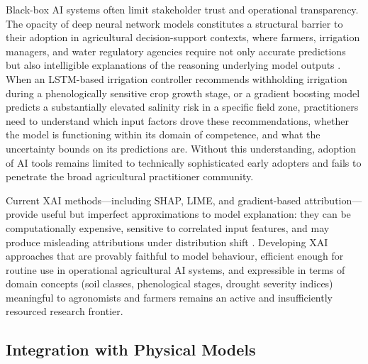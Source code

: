 \documentclass[land,article,submit,pdftex,moreauthors]{Definitions/mdpi}
\numberwithin{equation}{section}
\begin{document}
Black-box AI systems often limit stakeholder trust and operational transparency. The opacity of deep neural network models constitutes a structural barrier to their adoption in agricultural decision-support contexts, where farmers, irrigation managers, and water regulatory agencies require not only accurate predictions but also intelligible explanations of the reasoning underlying model outputs \citep{arrieta2020explainable}. When an LSTM-based irrigation controller recommends withholding irrigation during a phenologically sensitive crop growth stage, or a gradient boosting model predicts a substantially elevated salinity risk in a specific field zone, practitioners need to understand which input factors drove these recommendations, whether the model is functioning within its domain of competence, and what the uncertainty bounds on its predictions are. Without this understanding, adoption of AI tools remains limited to technically sophisticated early adopters and fails to penetrate the broad agricultural practitioner community.

Current XAI methods---including SHAP, LIME, and gradient-based attribution---provide useful but imperfect approximations to model explanation: they can be computationally expensive, sensitive to correlated input features, and may produce misleading attributions under distribution shift \citep{adebayo2018sanity}. Developing XAI approaches that are provably faithful to model behaviour, efficient enough for routine use in operational agricultural AI systems, and expressible in terms of domain concepts (soil classes, phenological stages, drought severity indices) meaningful to agronomists and farmers remains an active and insufficiently resourced research frontier.

\subsection{Integration with Physical Models}
\end{document}
